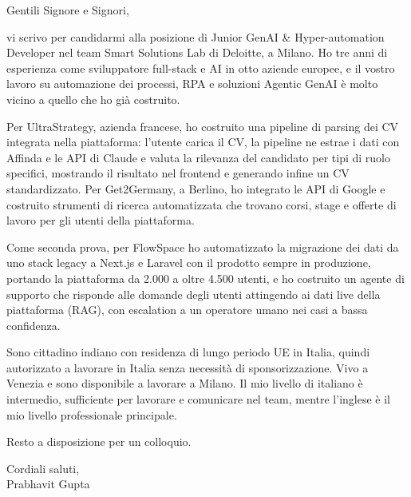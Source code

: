 \documentclass[a4paper,11pt]{article}
\begin{document}
Gentili Signore e Signori,

vi scrivo per candidarmi alla posizione di Junior GenAI \& Hyper-automation Developer nel team Smart Solutions Lab di Deloitte, a Milano. Ho tre anni di esperienza come sviluppatore full-stack e AI in otto aziende europee, e il vostro lavoro su automazione dei processi, RPA e soluzioni Agentic GenAI è molto vicino a quello che ho già costruito.

Per UltraStrategy, azienda francese, ho costruito una pipeline di parsing dei CV integrata nella piattaforma: l'utente carica il CV, la pipeline ne estrae i dati con Affinda e le API di Claude e valuta la rilevanza del candidato per tipi di ruolo specifici, mostrando il risultato nel frontend e generando infine un CV standardizzato. Per Get2Germany, a Berlino, ho integrato le API di Google e costruito strumenti di ricerca automatizzata che trovano corsi, stage e offerte di lavoro per gli utenti della piattaforma.

Come seconda prova, per FlowSpace ho automatizzato la migrazione dei dati da uno stack legacy a Next.js e Laravel con il prodotto sempre in produzione, portando la piattaforma da 2.000 a oltre 4.500 utenti, e ho costruito un agente di supporto che risponde alle domande degli utenti attingendo ai dati live della piattaforma (RAG), con escalation a un operatore umano nei casi a bassa confidenza.

Sono cittadino indiano con residenza di lungo periodo UE in Italia, quindi autorizzato a lavorare in Italia senza necessità di sponsorizzazione. Vivo a Venezia e sono disponibile a lavorare a Milano. Il mio livello di italiano è intermedio, sufficiente per lavorare e comunicare nel team, mentre l'inglese è il mio livello professionale principale.

Resto a disposizione per un colloquio.

Cordiali saluti,\\
Prabhavit Gupta
\end{document}

